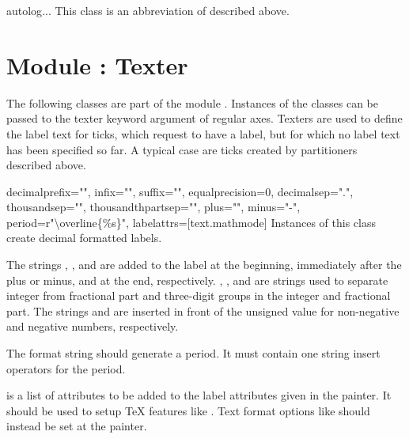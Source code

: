 \begin{classdesc}{autolog}{...}
This class is an abbreviation of  described above.
\end{classdesc} %

\section{Module : Texter} %


The following classes are part of the module .
Instances of the classes can be passed to the texter keyword argument
of regular axes. Texters are used to define the label text for ticks,
which request to have a label, but for which no label text has been specified
so far. A typical case are ticks created by partitioners described
above.

\begin{classdesc}{decimal}{prefix="", infix="", suffix="", equalprecision=0,
                           decimalsep=".", thousandsep="", thousandthpartsep="",
                           plus="", minus="-", period=r"\textbackslash overline\{\%s\}",
                           labelattrs=[text.mathmode]}
  Instances of this class create decimal formatted labels.

  The strings , , and  are added to
  the label at the beginning, immediately after the plus or minus, and at
  the end, respectively. , , and
   are strings used to separate integer from
  fractional part and three-digit groups in the integer and fractional
  part. The strings  and  are inserted in front
  of the unsigned value for non-negative and negative numbers,
  respectively.

  The format string  should generate a period. It must
  contain one string insert operators  for the period.

   is a list of attributes to be added to the label
  attributes given in the painter. It should be used to setup \TeX{}
  features like . Text format options like
   should instead be set at the painter.
\end{classdesc}

